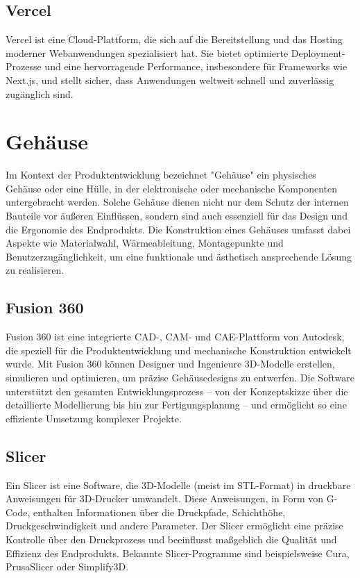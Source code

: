 \begin{inhalt}
\subsection{Vercel}
Vercel \cite{VercelWiki} ist eine Cloud-Plattform, die sich auf die Bereitstellung und das Hosting moderner Webanwendungen spezialisiert hat. Sie bietet optimierte Deployment-Prozesse und eine hervorragende Performance, insbesondere für Frameworks wie Next.js, und stellt sicher, dass Anwendungen weltweit schnell und zuverlässig zugänglich sind.

\section{Gehäuse}  
Im Kontext der Produktentwicklung bezeichnet "Gehäuse" ein physisches Gehäuse oder eine Hülle, in der elektronische oder mechanische Komponenten untergebracht werden. Solche Gehäuse dienen nicht nur dem Schutz der internen Bauteile vor äußeren Einflüssen, sondern sind auch essenziell für das Design und die Ergonomie des Endprodukts. Die Konstruktion eines Gehäuses umfasst dabei Aspekte wie Materialwahl, Wärmeableitung, Montagepunkte und Benutzerzugänglichkeit, um eine funktionale und ästhetisch ansprechende Lösung zu realisieren.

\subsection{Fusion 360}
\label{ref:fusion360_grundlagen}
Fusion 360 \cite{Fusion360} ist eine integrierte CAD-, CAM- und CAE-Plattform von Autodesk, die speziell für die Produktentwicklung und mechanische Konstruktion entwickelt wurde. Mit Fusion 360 können Designer und Ingenieure 3D-Modelle erstellen, simulieren und optimieren, um präzise Gehäusedesigns zu entwerfen. Die Software unterstützt den gesamten Entwicklungsprozess – von der Konzeptskizze über die detaillierte Modellierung bis hin zur Fertigungsplanung – und ermöglicht so eine effiziente Umsetzung komplexer Projekte.

\subsection{Slicer}

Ein Slicer \cite{Slicer} ist eine Software, die 3D-Modelle (meist im STL-Format) in druckbare Anweisungen für 3D-Drucker umwandelt. Diese Anweisungen, in Form von G-Code, enthalten Informationen über die Druckpfade, Schichthöhe, Druckgeschwindigkeit und andere Parameter. Der Slicer ermöglicht eine präzise Kontrolle über den Druckprozess und beeinflusst maßgeblich die Qualität und Effizienz des Endprodukts. Bekannte Slicer-Programme sind beispielsweise Cura, PrusaSlicer oder Simplify3D.


\end{inhalt}